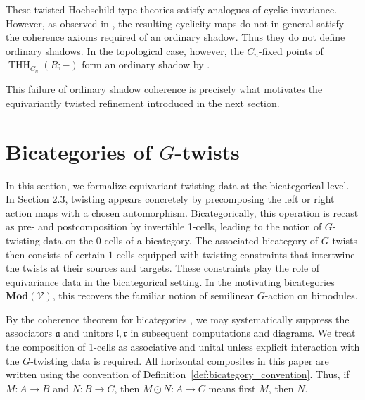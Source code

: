 \documentclass[11pt,oneside]{amsart}
\DeclareMathOperator{\THH}{THH}
\numberwithin{equation}{section}
\numberwithin{figure}{section}
\theoremstyle{plain}
\theoremstyle{definition}
\theoremstyle{remark}
\begin{document}
These twisted Hochschild-type theories satisfy analogues of cyclic
invariance. However, as observed in
\cite[Remarks~4.1.6 and~4.2.6]{AGHKK}, the resulting cyclicity maps do
not in general satisfy the coherence axioms required of an ordinary
shadow. Thus they do not define ordinary shadows. In the topological
case, however, the \(C_n\)-fixed points of
\(\THH_{C_n}(R;-)\) form an ordinary shadow by
\cite[Proposition~4.2.5]{AGHKK}.

This failure of ordinary shadow coherence is precisely what motivates
the equivariantly twisted refinement introduced in the next section.
 


\section{Bicategories of $G$-twists}
In this section, we formalize equivariant twisting data at the bicategorical level. In Section 2.3, twisting appears concretely by precomposing the left or right action maps with a chosen automorphism. Bicategorically, this operation is recast as pre- and postcomposition by invertible 1-cells, leading to the notion of $G$-twisting data on the 0-cells of a bicategory. The associated bicategory of \(G\)-twists then consists of certain
\(1\)-cells equipped with twisting constraints that intertwine the
twists at their sources and targets. These constraints play the role of equivariance data in the bicategorical setting. In the motivating bicategories $\mathbf{Mod}(\mathcal{V})$, this recovers the familiar notion of semilinear $G$-action on bimodules. 

By the coherence theorem for bicategories \cite{maclane1985coherence}, we may systematically suppress the associators $\mathfrak{a}$ and unitors $\mathfrak{l}, \mathfrak{r}$ in subsequent computations and diagrams. We treat the composition of 1-cells as associative and unital unless explicit interaction with the $G$-twisting data is required. All horizontal composites in this paper are written using the convention of Definition~\ref{def:bicategory_convention}. Thus, if $M\colon A\to B$ and $N\colon B\to C$, then $M\odot N: A\to C$ means first $M$, then $N$.
\end{document}
